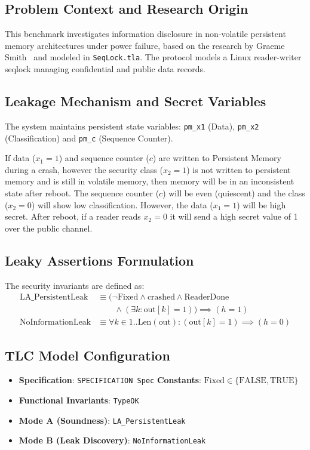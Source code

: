 \documentclass[a4paper,12pt]{report}
\begin{document}
\subsection{Problem Context and Research Origin}
This benchmark investigates information disclosure in non-volatile persistent memory architectures under power failure, based on the research by Graeme Smith~\cite{smith2026persistent} and modeled in \texttt{SeqLock.tla}. The protocol models a Linux reader-writer seqlock managing confidential and public data records.

\subsection{Leakage Mechanism and Secret Variables}
The system maintains persistent state variables: \texttt{pm\_x1} (Data), \texttt{pm\_x2} (Classification) and \texttt{pm\_c} (Sequence Counter).

If data ($x_1 = 1$) and sequence counter ($c$) are written to Persistent Memory during a crash, however the security class ($x_2 = 1$) is not written to persistent memory and is still in volatile memory, then memory will be in an inconsistent state after reboot. The sequence counter ($c$) will be even (quiescent) and the class ($x_2 = 0$) will show low classification. However, the data ($x_1 = 1$) will be high secret. After reboot, if a reader reads $x_2 = 0$ it will send a high secret value of 1 over the public channel.

\subsection{Leaky Assertions Formulation}
The security invariants are defined as:
\begin{align*}
    \text{LA\_PersistentLeak} &\equiv (\neg\text{Fixed} \land \text{crashed} \land \text{ReaderDone} \\
    &\qquad \land (\exists k : \text{out}[k] = 1)) \implies (h = 1) \\
    \text{NoInformationLeak} &\equiv \forall k \in 1..\text{Len}(\text{out}) : (\text{out}[k] = 1) \implies (h = 0)
\end{align*}

\subsection{TLC Model Configuration}
\begin{itemize}[itemsep=0.08em, topsep=0.08em]
    \item \textbf{Specification}: \texttt{SPECIFICATION Spec} \quad \textbf{Constants}: $\text{Fixed} \in \{\text{FALSE}, \text{TRUE}\}$
    \item \textbf{Functional Invariants}: \texttt{TypeOK}
    \item \textbf{Mode A (Soundness)}: \texttt{LA\_PersistentLeak}
    \item \textbf{Mode B (Leak Discovery)}: \texttt{NoInformationLeak}
\end{itemize}
\end{document}
